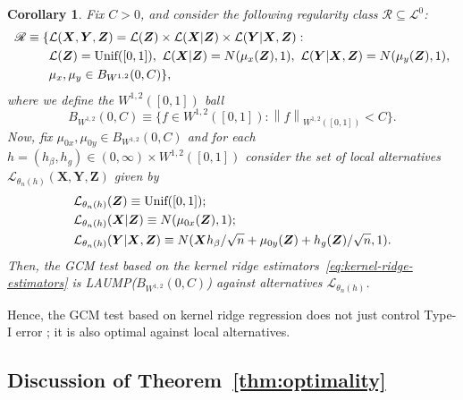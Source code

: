 \documentclass[aos]{imsart}
\theoremstyle{plain}
\newtheorem{corollary}{Corollary}
\theoremstyle{remark}
\newcommand{\norm}[1]{\left\lVert{#1}\right\rVert}		%
\newcommand{\prx}{\bm X}								%
\newcommand{\prz}{\bm Z}								%
\newcommand{\pry}{{\bm Y}}								%
\newcommand{\law}{\mathcal L}							%
\newcommand{\nulllaws}{\mathscr L^0}					%
\newcommand{\regclass}{\mathscr R}					    %
\begin{document}
\begin{corollary}\label{cor:RKHS_example}
    Fix $C>0$, and consider the following regularity class $\regclass \subseteq \nulllaws$:
    \begin{equation}
        \begin{split}
            \regclass \equiv \{&\law(\prx, \pry, \prz)=\law(\prz)\times \law(\prx|\prz)\times\law(\pry|\prx,\prz):\\
            &\law(\prz) = \textnormal{Unif}([0,1]),\ \law(\prx|\prz) = N(\mu_x(\prz), 1),\ \law(\pry|\prx, \prz) = N(\mu_{y}(\prz), 1), \\
            &\mu_x, \mu_y \in B_{W^{1,2}}(0, C)\},
        \end{split}
    \end{equation}
    where we define the $W^{1,2}([0,1])$ ball
    \begin{equation}
        B_{W^{1,2}}(0, C) \equiv \{f \in W^{1,2}([0,1]): \norm{f}_{W^{1,2}([0,1])} < C\}.
    \end{equation}
    Now, fix $\mu_{0x}, \mu_{0y} \in B_{W^{1,2}}(0, C)$ and for each $h=(h_\beta,h_g)\in(0,\infty)\times W^{1,2}([0,1])$ consider the set of local alternatives $\law_{\theta_n(h)}(\prx, \pry, \prz)$ given by 
    \begin{equation}
        \begin{split}
            &\law_{\theta_n(h)}(\prz) \equiv \textnormal{Unif}([0,1]); \\
            &\law_{\theta_n(h)}(\prx|\prz) \equiv N(\mu_{0x}(\prz), 1); \\
            &\law_{\theta_n(h)}(\pry|\prx, \prz) \equiv N(\prx h_\beta/\sqrt{n} + \mu_{0y}(\prz) + h_g(\prz)/\sqrt{n}, 1).
        \end{split}
    \end{equation}
    Then, the GCM test based on the kernel ridge estimators~\eqref{eq:kernel-ridge-estimators} is LAUMP($B_{W^{1,2}}(0, C)$) against alternatives $\law_{\theta_n(h)}$.
\end{corollary}

Hence, the GCM test based on kernel ridge regression does not just control Type-I error \citep[Theorem 11]{Shah2018}; it is also optimal against local alternatives.

\subsection{Discussion of Theorem~\ref{thm:optimality}} \label{sec:semiparametric-discussion}
\end{document}
